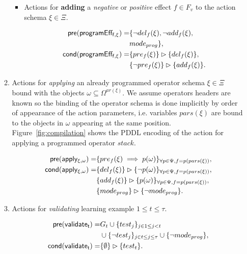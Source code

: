 \documentclass{article}
\newcommand{\pre}{\mathsf{pre}}     %
\newcommand{\cond}{\mathsf{cond}}   %
\begin{document}
\begin{itemize}
\begin{enumerate}
\begin{itemize}
\item Actions for {\bf adding} a {\em negative} or {\em positive} effect $f\in F_v$ to the action schema $\xi\in\Xi$.

\begin{small}
\begin{align*}
\hspace*{7pt}\pre(\mathsf{programEff_{f,\xi}})=&\{\neg del_{f}(\xi),\neg add_{f}(\xi),\\
& mode_{prog}\},\\
\cond(\mathsf{programEff_{f,\xi}})=&\{pre_{f}(\xi)\}\rhd\{del_{f}(\xi)\},\\
&\{\neg pre_{f}(\xi)\}\rhd\{add_{f}(\xi)\}.
\end{align*}
\end{small}
\end{itemize}

\item Actions for {\em applying} an already programmed operator schema $\xi\in\Xi$ bound with the objects $\omega\subseteq\Omega^{ar(\xi)}$. We assume operators headers are known so the binding of the operator schema is done implicitly by order of appearance of the action parameters, i.e. variables $pars(\xi)$ are bound to the objects in $\omega$ appearing at the same position. Figure~\ref{fig:compilation} shows the PDDL encoding of the action for applying a programmed operator $stack$.
\begin{small}
\begin{align*}
\hspace*{7pt}\pre(\mathsf{apply_{\xi,\omega}})=&\{pre_{f}(\xi)\implies p(\omega)\}_{\forall p\in\Psi,f=p(pars(\xi))},\\
\cond(\mathsf{apply_{\xi,\omega}})=&\{del_{f}(\xi)\}\rhd\{\neg p(\omega)\}_{\forall p\in\Psi,f=p(pars(\xi))},\\
&\{add_{f}(\xi)\}\rhd\{p(\omega)\}_{\forall p\in\Psi,f=p(pars(\xi))},\\
&\{mode_{prog}\}\rhd\{\neg mode_{prog}\}.
\end{align*}
\end{small}

\item Actions for {\em validating} learning example {\tt\small $1\leq t\leq \tau$}. 
\begin{small}
\begin{align*}
\hspace*{7pt}\pre(\mathsf{validate_{t}})=&G_t\cup\{test_j\}_{j\in 1\leq j<t}\\
&\cup\{\neg test_j\}_{j\in t\leq j\leq \tau}\cup \{\neg mode_{prog}\},\\
\cond(\mathsf{validate_{t}})=&\{\emptyset\}\rhd\{test_t\}.
\end{align*}
\end{small}
\end{enumerate}
\end{itemize}
\end{document}
